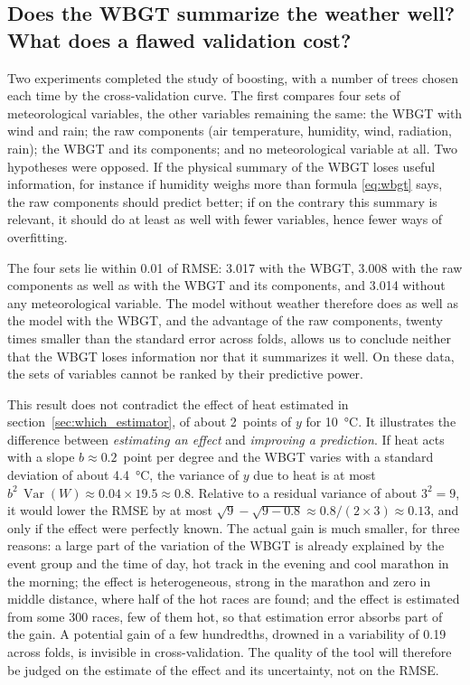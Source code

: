 \documentclass[11pt,a4paper]{article}
\DeclareMathOperator{\Var}{Var}
\begin{document}
\subsection{Does the WBGT summarize the weather well? What does a flawed validation cost?}\label{sec:raw_weather}

Two experiments completed the study of boosting, with a number of trees chosen each time by the cross-validation
curve. The first compares four sets of meteorological variables, the other variables remaining the same: the WBGT with
wind and rain; the raw components (air temperature, humidity, wind, radiation, rain); the WBGT and its components; and
no meteorological variable at all. Two hypotheses were opposed. If the physical summary of the WBGT loses useful
information, for instance if humidity weighs more than formula \eqref{eq:wbgt} says, the raw components should predict
better; if on the contrary this summary is relevant, it should do at least as well with fewer variables, hence fewer
ways of overfitting.

The four sets lie within 0.01 of RMSE: 3.017 with the WBGT, 3.008 with the raw components as well as with the WBGT and
its components, and 3.014 without any meteorological variable. The model without weather therefore does as well as
the model with the WBGT, and the advantage of the raw components, twenty times smaller than the standard error across
folds, allows us to conclude neither that the WBGT loses information nor that it summarizes it well. On these data, the
sets of variables cannot be ranked by their predictive power.

This result does not contradict the effect of heat estimated in section~\ref{sec:which_estimator}, of about 2~points of
$y$ for 10~°C. It illustrates the difference between \emph{estimating an effect} and \emph{improving a prediction}. If
heat acts with a slope $b \approx 0.2$~point per degree and the WBGT varies with a standard deviation of about 4.4~°C,
the variance of $y$ due to heat is at most $b^2\,\Var(W) \approx 0.04 \times 19.5 \approx 0.8$. Relative to a residual
variance of about $3^2 = 9$, it would lower the RMSE by at most
$\sqrt{9} - \sqrt{9 - 0.8} \approx 0.8/(2 \times 3) \approx 0.13$, and only if the effect were perfectly known. The
actual gain is much smaller, for three reasons: a large part of the variation of the WBGT is already explained by the
event group and the time of day, hot track in the evening and cool marathon in the morning; the effect is
heterogeneous, strong in the marathon and zero in middle distance, where half of the hot races are found; and the
effect is estimated from some 300 races, few of them hot, so that estimation error absorbs part of the gain. A
potential gain of a few hundredths, drowned in a variability of 0.19 across folds, is invisible in cross-validation.
The quality of the tool will therefore be judged on the estimate of the effect and its uncertainty, not on the RMSE.
\end{document}
